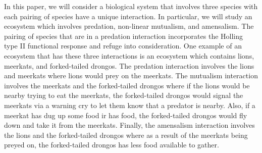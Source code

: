 In this paper, we will consider a biological system that involves three species with each pairing of species have a unique interaction. In particular, we will study an ecosystem which involves predation, non-linear mutualism, and amensalism. The pairing of species that are in a predation interaction incorporates the Holling type II functional response and refuge into consideration. One example of an ecosystem that has these three interactions is an ecosystem which contains lions, meerkats, and forked-tailed drongos. The predation interaction involves the lions and meerkats where lions would prey on the meerkats. The mutualism interaction involves the meerkats and the forked-tailed drongos where if the lions would be nearby trying to eat the meerkats, the forked-tailed drongos would signal the meerkats via a warning cry to let them know that a predator is nearby. Also, if a meerkat has dug up some food ir has food, the forked-tailed drongos would fly down and take it from the meerkats. Finally, the amensalism interaction involves the lions and the forked-tailed drongos where as a result of the meerkats being preyed on, the forked-tailed drongos has less food available to gather.